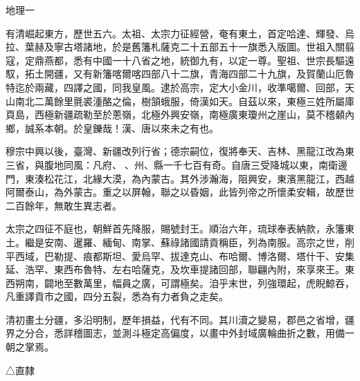 
\begin{pinyinscope}
地理一

有清崛起東方，歷世五六。太祖、太宗力征經營，奄有東土，首定哈達、輝發、烏拉、葉赫及寧古塔諸地，於是舊籓札薩克二十五部五十一旗悉入版圖。世祖入關翦寇，定鼎燕都，悉有中國一十八省之地，統御九有，以定一尊。聖祖、世宗長驅遠馭，拓土開疆，又有新籓喀爾喀四部八十二旗，青海四部二十九旗，及賀蘭山厄魯特迄於兩藏，四譯之國，同我皇風。逮於高宗，定大小金川，收準噶爾、回部，天山南北二萬餘里氈裘湩酪之倫，樹頷蛾服，倚漢如天。自茲以來，東極三姓所屬庫頁島，西極新疆疏勒至於蔥嶺，北極外興安嶺，南極廣東瓊州之崖山，莫不稽顙內鄉，誠系本朝。於皇鑠哉！漢、唐以來未之有也。

穆宗中興以後，臺灣、新疆改列行省；德宗嗣位，復將奉天、吉林、黑龍江改為東三省，與腹地同風：凡府、、州、縣一千七百有奇。自唐三受降城以東，南衛邊門，東湊松花江，北緣大漠，為內蒙古。其外涉瀚海，阻興安，東濱黑龍江，西越阿爾泰山，為外蒙古。重之以屏翰，聯之以昏姻，此皆列帝之所懷柔安輯，故歷世二百餘年，無敢生異志者。

太宗之四征不庭也，朝鮮首先降服，賜號封王。順治六年，琉球奉表納款，永籓東土。繼是安南、暹羅、緬甸、南掌、蘇祿諸國請貢稱臣，列為南服。高宗之世，削平西域，巴勒提、痕都斯坦、愛烏罕、拔達克山、布哈爾、博洛爾、塔什干、安集延、浩罕、東西布魯特、左右哈薩克，及坎車提諸回部，聯翩內附，來享來王。東西朔南，闢地至數萬里，幅員之廣，可謂極矣。洎乎末世，列強環起，虎睨鯨吞，凡重譯貢市之國，四分五裂，悉為有力者負之走矣。

清初畫土分疆，多沿明制，歷年損益，代有不同。其川瀆之變易，郡邑之省增，疆界之分合，悉詳稽圖志，並測斗極定高偏度，以畫中外封域廣輪曲折之數，用備一朝之掌焉。

△直隸


\end{pinyinscope}
